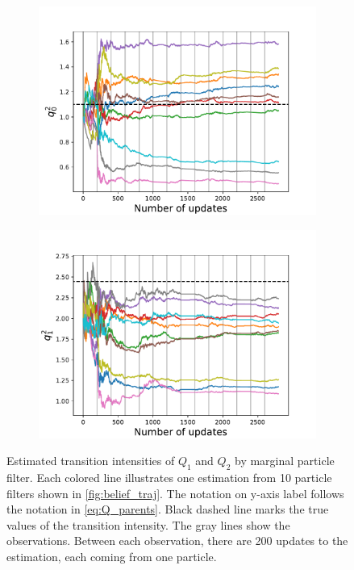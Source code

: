 \begin{figure}[H]
\begin{subfigure}{.5\textwidth}
		\includegraphics[width=1\linewidth]{figures/q_convergence/Q2_01}
		\caption{}
		\label{fig:Q2_01}
	\end{subfigure}
	\begin{subfigure}{.5\textwidth}
		\centering
		\includegraphics[width=1\linewidth]{figures/q_convergence/Q2_10}
		\caption{}
		\label{fig:Q2_10}
	\end{subfigure}
	\caption[Estimation of $ Q_1 $ and $ Q_2 $ by marginal particle filter]{Estimated transition intensities of $ Q_1 $ and $ Q_2 $ by marginal particle filter. Each colored line illustrates one estimation from 10 particle filters shown in \autoref{fig:belief_traj}. The notation on y-axis label follows the notation in \autoref{eq:Q_parents}. Black dashed line marks the true values of the transition intensity. The gray lines show the observations. Between each observation, there are 200 updates to the estimation, each coming from one particle.}
	\label{fig:q_convergence}
\end{figure}

